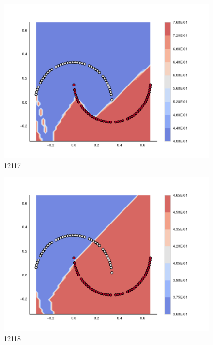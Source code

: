 \begin{subfigure}[b]{0.09\textwidth}
    \includegraphics[clip, trim=2.35cm 1.75cm 4.5cm 0cm,width=\textwidth]{img/convergence/12117.pdf}
    \caption{12117}
    \label{fig:convergence_12117}
\end{subfigure}
%
\begin{subfigure}[b]{0.09\textwidth}
    \includegraphics[clip, trim=2.35cm 1.75cm 4.5cm 0cm,width=\textwidth]{img/convergence/12118.pdf}
    \caption{12118}
    \label{fig:convergence_12118}
\end{subfigure}
%
